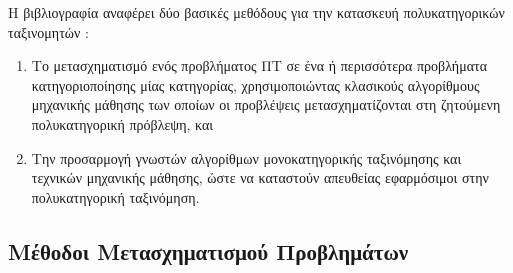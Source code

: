 Η βιβλιογραφία αναφέρει δύο βασικές μεθόδους για την κατασκευή πολυκατηγορικών ταξινομητών \cite{tsoumakas2007multi, aly2005survey}:
\begin{enumerate}
\item Το μετασχηματισμό ενός προβλήματος ΠΤ σε ένα ή περισσότερα προβλήματα κατηγοριοποίησης μίας κατηγορίας, χρησιμοποιώντας κλασικούς αλγορίθμους μηχανικής μάθησης των οποίων οι προβλέψεις μετασχηματίζονται στη ζητούμενη πολυκατηγορική πρόβλεψη, και
\item Την προσαρμογή γνωστών αλγορίθμων μονοκατηγορικής ταξινόμησης και τεχνικών μηχανικής μάθησης, ώστε να καταστούν απευθείας εφαρμόσιμοι στην πολυκατηγορική ταξινόμηση.
\end{enumerate}


\subsection{Μέθοδοι Μετασχηματισμού Προβλημάτων}
